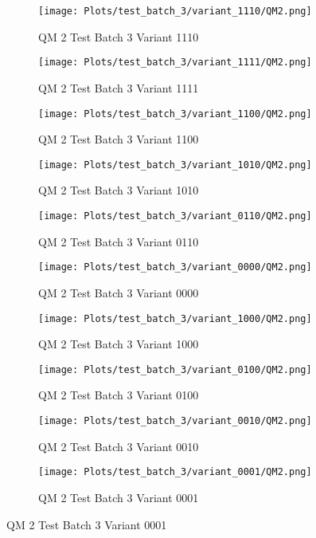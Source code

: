 \documentclass{DissertateFigs}
\begin{document}
\begin{figure}[t!]
    \begin{subfigure}{0.47\textwidth}
    \texttt{[image: Plots/test\_batch\_3/variant\_1110/QM2.png]}
    \caption{QM 2 Test Batch 3 Variant 1110}
    \end{subfigure}
    \begin{subfigure}{0.47\textwidth}
    \texttt{[image: Plots/test\_batch\_3/variant\_1111/QM2.png]}
    \caption{QM 2 Test Batch 3 Variant 1111}
    \end{subfigure}

\medskip

    \begin{subfigure}{0.47\textwidth}
    \texttt{[image: Plots/test\_batch\_3/variant\_1100/QM2.png]}
    \caption{QM 2 Test Batch 3 Variant 1100}
    \end{subfigure}
    \begin{subfigure}{0.47\textwidth}
    \texttt{[image: Plots/test\_batch\_3/variant\_1010/QM2.png]}
    \caption{QM 2 Test Batch 3 Variant 1010}
    \end{subfigure}

\medskip

    \begin{subfigure}{0.47\textwidth}
    \texttt{[image: Plots/test\_batch\_3/variant\_0110/QM2.png]}
    \caption{QM 2 Test Batch 3 Variant 0110}
    \end{subfigure}
    \begin{subfigure}{0.47\textwidth}
    \texttt{[image: Plots/test\_batch\_3/variant\_0000/QM2.png]}
    \caption{QM 2 Test Batch 3 Variant 0000}
    \end{subfigure}

\medskip

    \begin{subfigure}{0.47\textwidth}
    \texttt{[image: Plots/test\_batch\_3/variant\_1000/QM2.png]}
    \caption{QM 2 Test Batch 3 Variant 1000}
    \end{subfigure}
    \begin{subfigure}{0.47\textwidth}
    \texttt{[image: Plots/test\_batch\_3/variant\_0100/QM2.png]}
    \caption{QM 2 Test Batch 3 Variant 0100}
    \end{subfigure}

\medskip

    \begin{subfigure}{0.47\textwidth}
    \texttt{[image: Plots/test\_batch\_3/variant\_0010/QM2.png]}
    \caption{QM 2 Test Batch 3 Variant 0010}
    \end{subfigure}
    \begin{subfigure}{0.47\textwidth}
    \texttt{[image: Plots/test\_batch\_3/variant\_0001/QM2.png]}
    \caption{QM 2 Test Batch 3 Variant 0001}
    \end{subfigure}


\end{figure}
\end{document}
